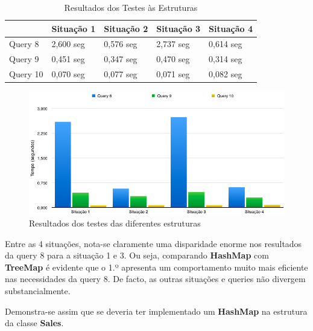 \documentclass[10pt] {article}
\begin{document}
\newpage

\begin{table}[h]
\centering
\caption{Resultados dos Testes às Estruturas}
\begin{tabular}{l|l|l|l|l|}
\cline{2-5}
                               & Situação 1 & Situação 2 & Situação 3 & Situação 4 \\ \hline
\multicolumn{1}{|l|}{Query 8}  & 2,600 seg  & 0,576 seg  & 2,737 seg  & 0,614 seg  \\ \hline
\multicolumn{1}{|l|}{Query 9}  & 0,451 seg  & 0,347 seg  & 0,470 seg  & 0,314 seg  \\ \hline
\multicolumn{1}{|l|}{Query 10} & 0,070 seg  & 0,077 seg  & 0,071 seg  & 0,082 seg  \\ \hline
\end{tabular}
\end{table}

\begin{figure}[ht!]
\centering
\includegraphics[width=150mm]{graphstruct.png}
\caption{Resultados dos testes das diferentes estruturas}
\label{fig:sales}
\end{figure}

\par Entre as 4 situações, nota-se claramente uma disparidade enorme nos resultados da query 8 para a situação 1 e 3.
Ou seja, comparando \color{blue} \textbf{HashMap} \color{black} com \color{blue} \textbf{TreeMap} \color{black} é evidente que
o 1.º apresenta um comportamento muito mais eficiente nas necessidades da query 8.
De facto, as outras situações e queries não divergem substancialmente.

\par Demonstra-se assim que se deveria ter implementado um \color{blue} \textbf{HashMap} \color{black} na estrutura da classe \color{blue}\textbf{Sales}\color{black}.

\newpage
\end{document}
